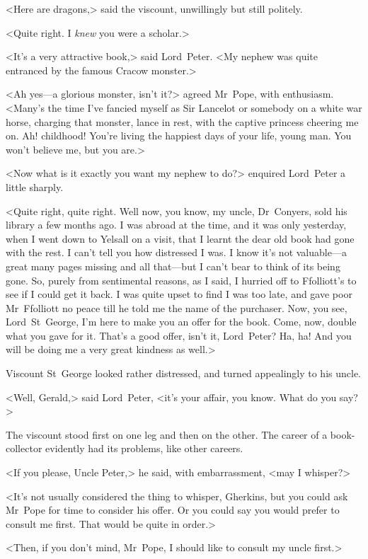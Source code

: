 <Here are dragons,> said the viscount, unwillingly but still politely.

<Quite right. I \emph{knew} you were a scholar.>

<It's a very attractive book,> said Lord~Peter. <My nephew was quite entranced by the famous Cracow monster.>

<Ah yes—a glorious monster, isn't it?> agreed Mr~Pope, with enthusiasm. <Many's the time I've fancied myself as Sir Lancelot or somebody on a white war horse, charging that monster, lance in rest, with the captive princess cheering me on. Ah! childhood! You're living the happiest days of your life, young man. You won't believe me, but you are.>

<Now what is it exactly you want my nephew to do?> enquired Lord~Peter a little sharply.

<Quite right, quite right. Well now, you know, my uncle, Dr~Conyers, sold his library a few months ago. I was abroad at the time, and it was only yesterday, when I went down to Yelsall on a visit, that I learnt the dear old book had gone with the rest. I can't tell you how distressed I was. I know it's not valuable—a great many pages missing and all that—but I can't bear to think of its being gone. So, purely from sentimental reasons, as I said, I hurried off to Ffolliott's to see if I could get it back. I was quite upset to find I was too late, and gave poor Mr~Ffolliott no peace till he told me the name of the purchaser. Now, you see, Lord~St~George, I'm here to make you an offer for the book. Come, now, double what you gave for it. That's a good offer, isn't it, Lord~Peter? Ha, ha! And you will be doing me a very great kindness as well.>

Viscount St~George looked rather distressed, and turned appealingly to his uncle.

<Well, Gerald,> said Lord~Peter, <it's your affair, you know. What do you say?>

The viscount stood first on one leg and then on the other. The career of a book-collector evidently had its problems, like other careers.

<If you please, Uncle Peter,> he said, with embarrassment, <may I whisper?>

<It's not usually considered the thing to whisper, Gherkins, but you could ask Mr~Pope for time to consider his offer. Or you could say you would prefer to consult me first. That would be quite in order.>

<Then, if you don't mind, Mr~Pope, I should like to consult my uncle first.>

